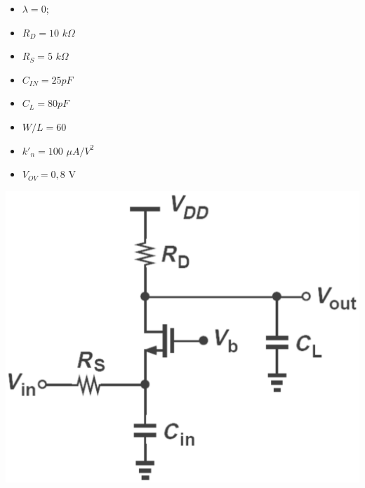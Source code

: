 \documentclass[addpoints]{exam}
\begin{document}
\begin{questions}
\begin{minipage}[m]{0.3\textwidth}
\begin{itemize}
    \item $\lambda = 0$;
    \item $R_D = 10$ $k\Omega$
    \item $R_S = 5$ $k\Omega$
    \item $C_{IN} = 25 pF$
    \item $C_{L} = 80 pF$
    \item $W/L = 60$
    \item $k'_n = 100$ $\mu A/V^2$
    \item $V_{OV} = 0,8$ V
\end{itemize}
\end{minipage}
\hspace{5mm}
\begin{minipage}[m]{0.4\textwidth}
\includegraphics[width=\textwidth]{imagens/3.png}
\end{minipage}












\end{questions}
\end{document}
